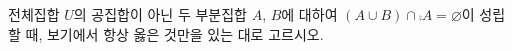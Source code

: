 전체집합 $U$의 공집합이 아닌 두 부분집합 $A$, $B$에 대하여 $(A\cup B)\cap\comp{A}=\varnothing$이 성립할 때, 보기에서 항상 옳은 것만을 있는 대로 고르시오. 
